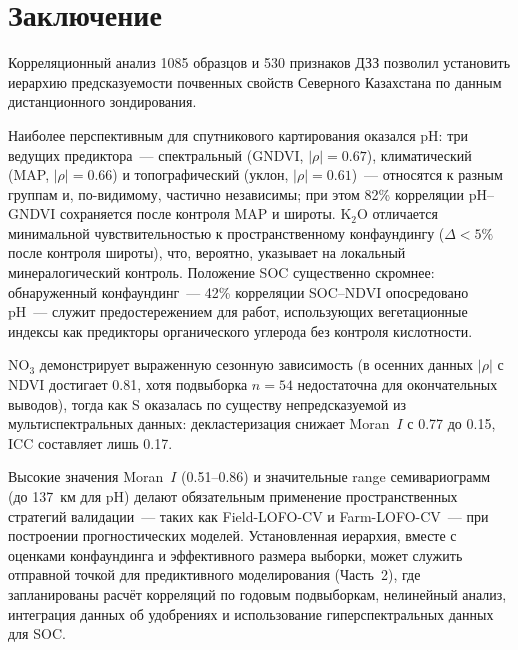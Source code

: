 \section{Заключение}
\label{sec:conclusion}

Корреляционный анализ 1085 образцов и 530 признаков ДЗЗ позволил установить иерархию предсказуемости почвенных свойств Северного Казахстана по данным дистанционного зондирования.

Наиболее перспективным для спутникового картирования оказался pH: три ведущих предиктора~--- спектральный (GNDVI, $|\rho| = 0.67$), климатический (MAP, $|\rho| = 0.66$) и топографический (уклон, $|\rho| = 0.61$)~--- относятся к разным группам и, по-видимому, частично независимы; при этом 82\% корреляции pH--GNDVI сохраняется после контроля MAP и широты. K$_2$O отличается минимальной чувствительностью к пространственному конфаундингу ($\Delta < 5\%$ после контроля широты), что, вероятно, указывает на локальный минералогический контроль. Положение SOC существенно скромнее: обнаруженный конфаундинг~--- 42\% корреляции SOC--NDVI опосредовано pH~--- служит предостережением для работ, использующих вегетационные индексы как предикторы органического углерода без контроля кислотности.

NO$_3$ демонстрирует выраженную сезонную зависимость (в осенних данных $|\rho|$ с NDVI достигает 0.81, хотя подвыборка $n = 54$ недостаточна для окончательных выводов), тогда как S оказалась по существу непредсказуемой из мультиспектральных данных: декластеризация снижает Moran~$I$ с 0.77 до 0.15, ICC составляет лишь 0.17.

Высокие значения Moran~$I$ (0.51--0.86) и значительные range семивариограмм (до 137~км для pH) делают обязательным применение пространственных стратегий валидации~--- таких как Field-LOFO-CV и Farm-LOFO-CV~--- при построении прогностических моделей. Установленная иерархия, вместе с оценками конфаундинга и эффективного размера выборки, может служить отправной точкой для предиктивного моделирования (Часть~2), где запланированы расчёт корреляций по годовым подвыборкам, нелинейный анализ, интеграция данных об удобрениях и использование гиперспектральных данных для SOC.

